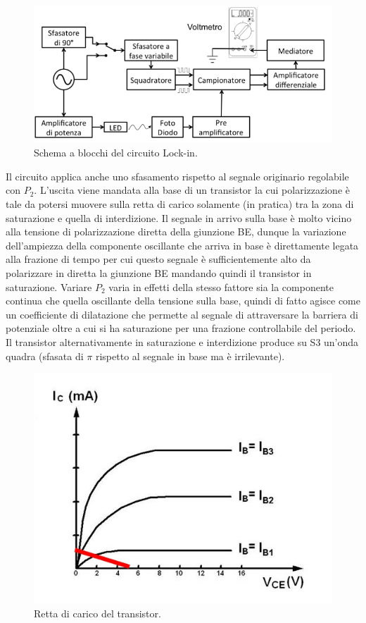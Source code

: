 \documentclass[10pt,a4paper]{article}
\begin{document}
\begin{figure}[!htb]
  \centering
  \includegraphics[scale=0.75]{schemablocchi.png}
\caption{Schema a blocchi del circuito Lock-in.\label{fig:schemablocchi}}
\end{figure}

Il circuito applica anche uno sfasamento rispetto al segnale originario regolabile con $P_2$. L'uscita viene mandata alla base di un transistor la cui polarizzazione è tale da potersi muovere sulla retta di carico solamente (in pratica) tra la zona di saturazione e quella di interdizione. Il segnale in arrivo sulla base è molto vicino alla tensione di polarizzazione diretta della giunzione BE, dunque la variazione dell'ampiezza della componente oscillante che arriva in base è direttamente legata alla frazione di tempo per cui questo segnale è sufficientemente alto da polarizzare in diretta la giunzione BE mandando quindi il transistor in saturazione. Variare $P_2$ varia in effetti della stesso fattore sia la componente continua che quella oscillante della tensione sulla base, quindi di fatto agisce come un coefficiente di dilatazione che permette al segnale di attraversare la barriera di potenziale oltre a cui si ha saturazione per una frazione controllabile del periodo.
Il transistor alternativamente in saturazione e interdizione produce su S3 un'onda quadra (sfasata di $\pi$ rispetto al segnale in base ma è irrilevante).\\


\begin{figure}[!htb]
  \centering
  \includegraphics[scale=0.75]{transistor.jpg}
\caption{Retta di carico del transistor.\label{fig:transistor}}
\end{figure}
\end{document}
